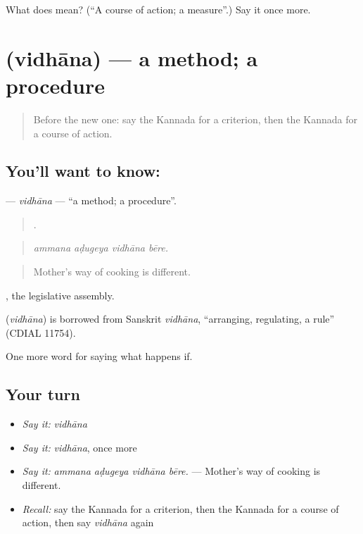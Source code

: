 \begin{tcolorbox}[breakable,colback=teal!4,colframe=teal!35!black,title={Before you move on}]
What does  mean? (\textquotedblleft{}A course of action; a measure\textquotedblright{}.) Say it once more.
\end{tcolorbox}
\section[\texorpdfstring{\kn{ವಿಧಾನ} (vidhāna)}{ವಿಧಾನ (vidhāna)}]{ (vidhāna) — a method; a procedure}

\label{lesson:KA-C422-vidhana}



\begin{quote}
Before the new one: say the Kannada for a criterion, then the Kannada for a course of action.
\end{quote}

\subsection*{You'll want to know: }
\textbf{} — \emph{vidhāna} — \textquotedblleft{}a method; a procedure\textquotedblright{}.

\begin{quote}
   .
\end{quote}

\begin{quote}
\emph{ammana aḍugeya vidhāna bēre.}
\end{quote}

\begin{quote}
Mother's way of cooking is different.
\end{quote}

, the legislative assembly.

\begin{cousinweb}
\textbf{} (\emph{vidhāna}) is borrowed from Sanskrit \emph{vidhāna}, \textquotedblleft{}arranging, regulating, a rule\textquotedblright{} (CDIAL 11754).
\end{cousinweb}

\begin{grammarlens}[title={What you've built}]
One more word for saying what happens if.
\end{grammarlens}

\subsection*{Your turn}
\begin{itemize}
\raggedright
  \item \emph{Say it:} \emph{vidhāna}
  \item \emph{Say it:} \emph{vidhāna}, once more
  \item \emph{Say it:} \emph{ammana aḍugeya vidhāna bēre.} — Mother's way of cooking is different.
  \item \emph{Recall:} say the Kannada for a criterion, then the Kannada for a course of action, then say \emph{vidhāna} again
\end{itemize}

